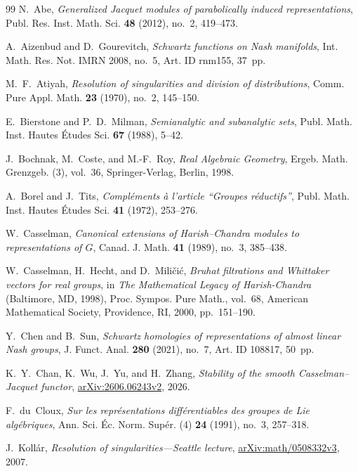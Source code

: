 \documentclass[a4paper,12pt]{amsart}
\numberwithin{equation}{section}
\theoremstyle{definition}
\theoremstyle{remark}
\begin{document}
\begin{thebibliography}{99}
N.~Abe,
\emph{Generalized Jacquet modules of parabolically induced representations},
Publ. Res. Inst. Math. Sci. \textbf{48} (2012), no.~2, 419--473.

A.~Aizenbud and D.~Gourevitch,
\emph{Schwartz functions on Nash manifolds},
Int. Math. Res. Not. IMRN 2008, no.~5, Art. ID rnm155, 37~pp.

M.~F.~Atiyah,
\emph{Resolution of singularities and division of distributions},
Comm. Pure Appl. Math. \textbf{23} (1970), no.~2, 145--150.

E.~Bierstone and P.~D.~Milman,
\emph{Semianalytic and subanalytic sets},
Publ. Math. Inst. Hautes \'Etudes Sci. \textbf{67} (1988), 5--42.

J.~Bochnak, M.~Coste, and M.-F.~Roy,
\emph{Real Algebraic Geometry},
Ergeb. Math. Grenzgeb. (3), vol.~36,
Springer-Verlag, Berlin, 1998.

A.~Borel and J.~Tits,
\emph{Compl\'ements \`a l'article ``Groupes r\'eductifs''},
Publ. Math. Inst. Hautes \'Etudes Sci. \textbf{41} (1972), 253--276.

W.~Casselman,
\emph{Canonical extensions of Harish--Chandra modules to representations of $G$},
Canad. J. Math. \textbf{41} (1989), no.~3, 385--438.

W.~Casselman, H.~Hecht, and D.~Mili\v{c}i\'{c},
\emph{Bruhat filtrations and Whittaker vectors for real groups},
in \emph{The Mathematical Legacy of Harish-Chandra} (Baltimore, MD, 1998),
Proc. Sympos. Pure Math., vol.~68,
American Mathematical Society, Providence, RI, 2000, pp.~151--190.

Y.~Chen and B.~Sun,
\emph{Schwartz homologies of representations of almost linear Nash groups},
J. Funct. Anal. \textbf{280} (2021), no.~7, Art. ID 108817, 50~pp.

K.~Y.~Chan, K.~Wu, J.~Yu, and H.~Zhang,
\emph{Stability of the smooth Casselman--Jacquet functor},
\href{https://arxiv.org/abs/2606.06243v2}{arXiv:2606.06243v2}, 2026.

F.~du~Cloux,
\emph{Sur les repr\'esentations diff\'erentiables des groupes de Lie alg\'ebriques},
Ann. Sci. \'Ec. Norm. Sup\'er. (4) \textbf{24} (1991), no.~3, 257--318.

J.~Koll\'ar,
\emph{Resolution of singularities---Seattle lecture},
\href{https://arxiv.org/abs/math/0508332v3}{arXiv:math/0508332v3}, 2007.


\end{thebibliography}
\end{document}
